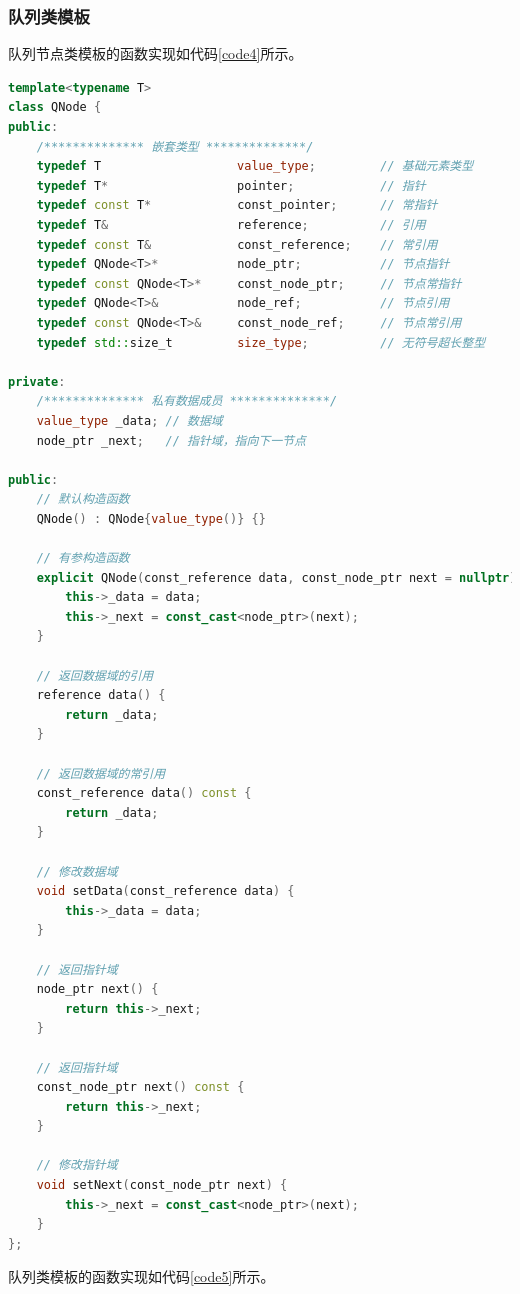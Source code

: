 \documentclass{ctexart}
\begin{document}
    \subsubsection{队列类模板}
    队列节点类模板的函数实现如代码\ref{code4}所示。
\begin{lstlisting}[language=C++,caption=QNode<T>类模板的实现,label=code4]
template<typename T>
class QNode {
public:
    /************** 嵌套类型 **************/
    typedef T                   value_type;         // 基础元素类型
    typedef T*                  pointer;            // 指针
    typedef const T*            const_pointer;      // 常指针
    typedef T&                  reference;          // 引用
    typedef const T&            const_reference;    // 常引用
    typedef QNode<T>*           node_ptr;           // 节点指针
    typedef const QNode<T>*     const_node_ptr;     // 节点常指针
    typedef QNode<T>&           node_ref;           // 节点引用
    typedef const QNode<T>&     const_node_ref;     // 节点常引用
    typedef std::size_t         size_type;          // 无符号超长整型

private:
    /************** 私有数据成员 **************/
    value_type _data; // 数据域
    node_ptr _next;   // 指针域，指向下一节点

public:
    // 默认构造函数
    QNode() : QNode{value_type()} {}

    // 有参构造函数
    explicit QNode(const_reference data, const_node_ptr next = nullptr) {
        this->_data = data;
        this->_next = const_cast<node_ptr>(next);
    }

    // 返回数据域的引用
    reference data() {
        return _data;
    }

    // 返回数据域的常引用
    const_reference data() const {
        return _data;
    }

    // 修改数据域
    void setData(const_reference data) {
        this->_data = data;
    }

    // 返回指针域
    node_ptr next() {
        return this->_next;
    }

    // 返回指针域
    const_node_ptr next() const {
        return this->_next;
    }

    // 修改指针域
    void setNext(const_node_ptr next) {
        this->_next = const_cast<node_ptr>(next);
    }
};
\end{lstlisting}
    队列类模板的函数实现如代码\ref{code5}所示。
\end{document}
